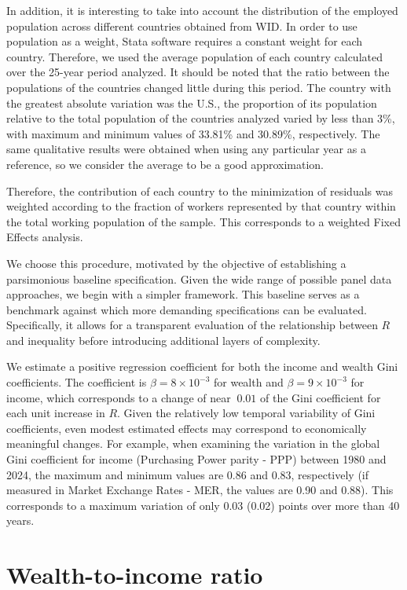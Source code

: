 \documentclass[12pt]{article}
\begin{document}
In addition, it is interesting to take into account the distribution of the employed population across different countries obtained from WID.  In order to use population as a weight, Stata software requires a constant weight for each country. Therefore, we used the average population of each country calculated over the 25-year period analyzed. It should be noted that the ratio between the populations of the countries changed little during this period.  The country with the greatest absolute variation was the  U.S., the proportion of its population relative to the total population of the countries analyzed varied by less than 3\%, with maximum and minimum values of 33.81\% and 30.89\%, respectively. The same qualitative results were obtained when using any particular year as a reference, so we consider the average to be a good approximation.

Therefore, the contribution of each country to the minimization of residuals was weighted according to the fraction of workers represented by that country within the total working population of the sample. This corresponds to a weighted Fixed Effects analysis.

We choose this procedure, motivated by the objective of establishing a parsimonious baseline specification. Given the wide range of possible panel data approaches, we begin with a simpler framework. This baseline serves as a benchmark against which more demanding specifications can be evaluated. Specifically, it allows for a transparent evaluation of the relationship between $R$ and inequality before introducing additional layers of complexity.

We estimate a positive regression coefficient for both the income and wealth Gini coefficients. The coefficient is $\beta=8\times10^{-3}$ for wealth and $\beta=9\times10^{-3}$ for income, which corresponds to a change of near $~0.01$ of the Gini coefficient for each unit increase in $R$.   Given the relatively low temporal variability of Gini coefficients, even modest estimated effects may correspond to economically meaningful changes.  For example, when examining the variation in the global Gini coefficient for income (Purchasing Power parity - PPP) between 1980 and 2024, the maximum and minimum values are 0.86 and 0.83, respectively (if measured in Market Exchange Rates - MER, the values are 0.90 and 0.88). This corresponds to a maximum variation of only 0.03 (0.02) points over more than 40 years.

 \section{ Wealth-to-income ratio }
 
\end{document}
